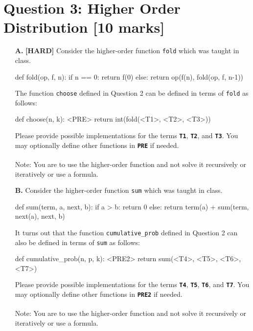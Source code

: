 \newpage
\section{Question 3: Higher Order Distribution [10 marks]}
\begin{enumerate}
\item[\textbf{A.}]
\textbf{[HARD]} Consider the higher-order function \colorbox{CornflowerBlue!20}{\texttt{fold}} which was taught in class.
\begin{python}
def fold(op, f, n):
    if n == 0:
        return f(0)
    else:
        return op(f(n), fold(op, f, n-1))
\end{python}
The function \colorbox{CornflowerBlue!20}{\texttt{choose}} defined in Question 2 can be defined in terms of \colorbox{CornflowerBlue!20}{\texttt{fold}} 
as follows:
\begin{python}
def choose(n, k):
    <PRE>
    return int(fold(<T1>, <T2>, <T3>))
\end{python}
Please provide possible implementations for the terms \texttt{\bfseries T1}, \texttt{\bfseries T2}, and \texttt{\bfseries T3}. 
You may optionally define other functions in \texttt{\bfseries PRE} if needed. \\ \\
Note: You are to use the higher-order function and not solve it recursively or iteratively or use a formula.
\begin{flushright}
    [6 marks]
\end{flushright}

\item[\textbf{B.}]
Consider the higher-order function \colorbox{CornflowerBlue!20}{\texttt{sum}} which was taught in class.
\begin{python}
def sum(term, a, next, b):
    if a > b:
        return 0
    else:
        return term(a) + sum(term, next(a), next, b)
\end{python}
It turns out that the function \colorbox{CornflowerBlue!20}{\texttt{cumulative\_prob}} defined in Question 2 can also be defined in terms 
of \colorbox{CornflowerBlue!20}{\texttt{sum}} as follows:
\begin{python}
def cumulative_prob(n, p, k):
    <PRE2>
    return sum(<T4>, <T5>, <T6>, <T7>)
\end{python}
Please provide possible implementations for the terms \texttt{\bfseries T4}, \texttt{\bfseries T5}, \texttt{\bfseries T6}, 
and \texttt{\bfseries T7}. You may optionally define other functions in \texttt{\bfseries PRE2} if needed. \\ \\
Note: You are to use the higher-order function and not solve it recursively or iteratively or use a formula.
\begin{flushright}
    [4 marks]
\end{flushright} 
\end{enumerate}

